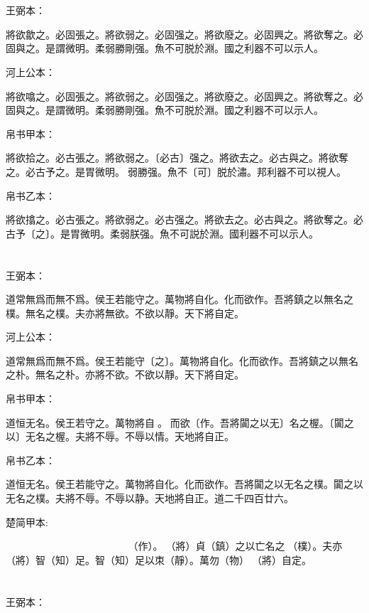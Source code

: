 \documentclass[a5paper]{ctexbook}
\begin{document}
    \chapter{}
    王弼本：

    將欲歙之。必固張之。將欲弱之。必固强之。將欲廢之。必固興之。將欲奪之。必固與之。是謂微明。柔弱勝剛强。魚不可脱於淵。國之利器不可以示人。

    河上公本：

    將欲噏之。必固張之。將欲弱之。必固强之。將欲廢之。必固興之。將欲奪之。必固與之。是謂微明。柔弱勝剛强。魚不可脱於淵。國之利器不可以示人。

    帛书甲本：

    將欲拾之。必古張之。將欲弱之。〔必古〕强之。將欲去之。必古與之。將欲奪之。必古予之。是胃微明。󱁩弱勝强。魚不〔可〕脱於潚。邦利器不可以視人。

    帛书乙本：

    將欲㩉之。必古張之。將欲弱之。必古强之。將欲去之。必古與之。將欲奪之。必古予〔之〕。是胃微明。柔弱朕强。魚不可説於淵。國利器不可以示人。

    \chapter{}
    王弼本：

    道常無爲而無不爲。侯王若能守之。萬物將自化。化而欲作。吾將鎮之以無名之樸。無名之樸。夫亦將無欲。不欲以靜。天下將自定。

    河上公本：

    道常無爲而無不爲。侯王若能守〔之〕。萬物將自化。化而欲作。吾將鎮之以無名之朴。無名之朴。亦將不欲。不欲以靜。天下將自定。

    帛书甲本：

    道恒无名。侯王若守之。萬物將自𢡺。𢡺而欲〔作。吾將闐之以无〕名之楃。〔闐之以〕无名之楃。夫將不辱。不辱以情。天地將自正。

    帛书乙本：

    道恒无名。侯王若能守之。萬物將自化。化而欲作。吾將闐之以无名之樸。闐之以无名之樸。夫將不辱。不辱以静。天地將自正。道二千四百廿六。

    楚简甲本:

    𧗟（道）𠄨（恒）亡爲也。侯王能守之。而萬勿（物）𨟻（將）自𢠿（化）。𢠿（化）而𨿜（欲）󶴮（作）。𨟻（將）貞（鎮）之以亡名之󶴯（樸）。夫亦𨟻（將）智（知）足。智（知）足以朿（靜）。萬勿（物）𨟻（將）自定。

    \chapter{}
    王弼本：
\end{document}
